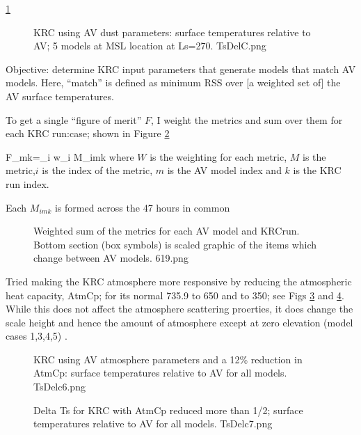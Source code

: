 \documentclass{article}
\begin{document}
\ref{TsDelC}
\begin{figure}[!ht] 
\caption[Tsur: KRC-AV]{KRC using AV dust parameters: surface temperatures relative to AV; 5 models at MSL location at Ls=270. 
\label{TsDelC} TsDelC.png }
\end{figure} 

Objective: determine KRC input parameters that generate models that match AV models. Here, ``match'' is defined as minimum RSS over [a weighted set of] the AV surface temperatures. 

To get a single ``figure of merit'' $F$, I weight the metrics and sum over them for each KRC run:case; shown in Figure \ref{619}

\qbn F_{mk}=\sum_{i} w_i M_{imk} 
where $W$ is the weighting for each metric, $M$ is the metric,$i$ is the index of the metric, $m$ is the AV model index and $k$ is the KRC run index.

Each $M_{imk}$ is formed across the 47 hours in common

\begin{figure}[!ht] 
\caption[Figure of merit: 1]{Weighted sum of the metrics for each AV model and KRCrun. Bottom section (box symbols) is scaled graphic of the items which change between AV models. 
\label{619} 619.png  }
\end{figure} 

Tried making the KRC atmosphere more responsive by reducing the atmospheric heat capacity, AtmCp; for its normal 735.9 to 650 and to 350; see Figs \ref{TsDelc6} and \ref{TsDelc7}. While this does not affect the atmosphere scattering proerties, it does change the scale height and hence the amount of atmosphere except at zero elevation (model cases 1,3,4,5) . 

\begin{figure}[!ht] 
\caption[Delta Ts for KRC with slightly reduced AtmCp]{KRC using AV atmosphere parameters and a 12\% reduction in AtmCp: surface temperatures relative to AV for all models.
\label{TsDelc6} TsDelc6.png }
\end{figure} 

\begin{figure}[!ht] 
\caption[Delta Ts for KRC with greatly reduced AtmCp]{Delta Ts for KRC with AtmCp reduced more than 1/2; surface temperatures relative to AV for all models.
\label{TsDelc7} TsDelc7.png }
\end{figure} 
\end{document}
